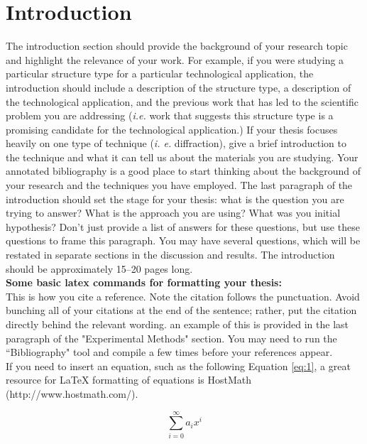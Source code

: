 \documentclass[12pt]{article}
\begin{document}
\section{Introduction}

The introduction section should provide the background of your research topic and highlight the relevance of your work. For example, if you were studying a particular structure type for a particular technological application, the introduction should include a description of the structure type, a description of the technological application, and the previous work that has led to the scientific problem you are addressing (\textit{i.e.} work that suggests this structure type is a promising candidate for the technological application.) If your thesis focuses heavily on one type of technique (\textit{i. e.} diffraction), give a brief introduction to the technique and what it can tell us about the materials you are studying. Your annotated bibliography is a good place to start thinking about the background of your research and the techniques you have employed. The last paragraph of the introduction should set the stage for your thesis: what is the question you are trying to answer? What is the approach you are using? What was you initial hypothesis? Don't just provide a list of answers for these questions, but use these questions to frame this paragraph. You may have several questions, which will be restated in separate sections in the discussion and results. The introduction should be approximately 15--20 pages long. \\ 

\textbf{Some basic latex commands for formatting your thesis:}\\

This is how you cite a reference.\cite{RN3864} Note the citation follows the punctuation. Avoid bunching all of your citations at the end of the sentence; rather, put the citation directly behind the relevant wording. an example of this is provided in the last paragraph of the "Experimental Methods" section. You may need to run the ``Bibliography" tool and compile a few times before your references appear.\\

If you need to insert an equation, such as the following Equation \ref{eq:1}, a great resource for LaTeX formatting of equations is HostMath (http://www.hostmath.com/).

\begin{equation} \label{eq:1}
\sum_{i=0}^{\infty} a_i x^i
\end{equation}
\end{document}
